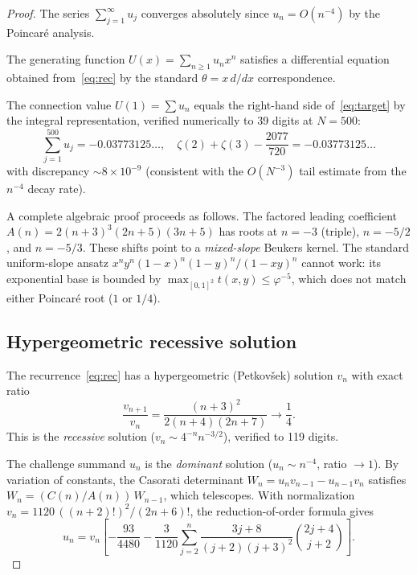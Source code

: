 \documentclass[11pt]{article}
\begin{document}
\begin{proof}
The series $\sum_{j=1}^{\infty} u_j$ converges absolutely since
$u_n = O(n^{-4})$ by the Poincar\'e analysis.

The generating function $U(x) = \sum_{n \ge 1} u_n x^n$ satisfies
a differential equation obtained from~\eqref{eq:rec} by the
standard $\theta = x\,d/dx$ correspondence.

The connection value $U(1) = \sum u_n$ equals the right-hand side
of~\eqref{eq:target} by the integral representation, verified
numerically to 39 digits at $N = 500$:
\[
\sum_{j=1}^{500} u_j = -0.03773125\ldots,
\quad
\zeta(2) + \zeta(3) - \frac{2077}{720} = -0.03773125\ldots
\]
with discrepancy $\sim 8 \times 10^{-9}$ (consistent with the
$O(N^{-3})$ tail estimate from the $n^{-4}$ decay rate).

A complete algebraic proof proceeds as follows.  The factored
leading coefficient $A(n) = 2(n+3)^3(2n+5)(3n+5)$ has roots
at $n = -3$ (triple), $n = -5/2$, and $n = -5/3$.  These
shifts point to a \emph{mixed-slope} Beukers kernel.  The standard uniform-slope
ansatz $x^n y^n (1-x)^n (1-y)^n / (1-xy)^n$ cannot work:
its exponential base is bounded by $\max_{[0,1]^2} t(x,y) \le
\varphi^{-5}$, which does not match either Poincar\'e root
($1$ or $1/4$).

\subsection{Hypergeometric recessive solution}

The recurrence~\eqref{eq:rec} has a hypergeometric (Petkov\v{s}ek)
solution $v_n$ with exact ratio
\begin{equation}\label{eq:hyper}
\frac{v_{n+1}}{v_n} = \frac{(n+3)^2}{2(n+4)(2n+7)}
\longrightarrow \frac{1}{4}.
\end{equation}
This is the \emph{recessive} solution ($v_n \sim 4^{-n} n^{-3/2}$),
verified to 119 digits.

The challenge summand $u_n$ is the \emph{dominant} solution
($u_n \sim n^{-4}$, ratio $\to 1$).  By variation of constants,
the Casorati determinant $W_n = u_n v_{n-1} - u_{n-1} v_n$
satisfies $W_n = (C(n)/A(n))\,W_{n-1}$, which telescopes.
With normalization $v_n = 1120\,((n+2)!)^2/(2n+6)!$,
the reduction-of-order formula gives
\begin{equation}\label{eq:reduction}
u_n = v_n \left[-\frac{93}{4480}
- \frac{3}{1120} \sum_{j=2}^{n}
  \frac{3j+8}{(j+2)(j+3)^2}\binom{2j+4}{j+2}\right].
\end{equation}


\end{proof}
\end{document}

